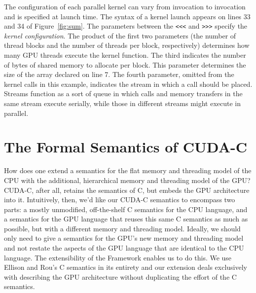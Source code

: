 The configuration of each parallel kernel can vary from invocation to invocation
and is specified at launch time. The syntax of a kernel launch appears on lines
33 and 34 of Figure~\ref{fig:sum}. The parameters between the \verb|<<<| and
\verb|>>>| specify the {\em kernel configuration}. The product of the first two
parameters (the number of thread blocks and the number of threads per block,
respectively) determines how many GPU threads execute the kernel function. The
third indicates the number of bytes of shared memory to allocate per block. This
parameter determines the size of the array declared on line 7. The fourth
parameter, omitted from the kernel calls in this example, indicates the stream
in which a call should be placed. Streams function as a sort of queue in which
calls and memory transfers in the same stream execute serially, while those in
different streams might execute in parallel.

\section{The Formal Semantics of CUDA-C}
How does one extend a semantics for the flat memory and threading model of the
CPU with the additional, hierarchical memory and threading model of the GPU?
CUDA-C, after all, retains the semantics of C, but embeds the GPU architecture
into it. Intuitively, then, we'd like our CUDA-C semantics to encompass two
parts: a mostly unmodified, off-the-shelf C semantics for the CPU language, and
a semantics for the GPU language that reuses this same C semantics as much as
possible, but with a different memory and threading model. Ideally, we should
only need to give a semantics for the GPU's new memory and threading model and
not restate the aspects of the GPU language that are identical to the CPU
language. The extensibility of the \K Framework enables us to do this. We use
Ellison and Rou's C semantics in its entirety and our extension deals
exclusively with describing the GPU architecture without duplicating the effort
of the C semantics.

